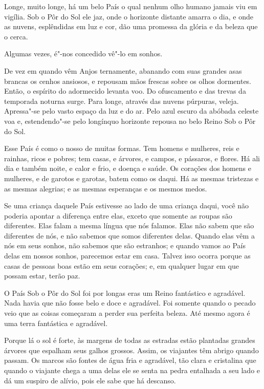  

Longe, muito longe, há um belo País o qual nenhum olho humano jamais viu
em vigília. Sob o Pôr do Sol ele jaz, onde o horizonte distante amarra o
dia, e onde as nuvens, esplêndidas em luz e cor, dão uma promessa da
glória e da beleza que o cerca.

Algumas vezes, é"-nos concedido vê"-lo em sonhos.

De vez em quando vêm Anjos ternamente, abanando com suas grandes asas
brancas os cenhos ansiosos, e repousam mãos frescas sobre os olhos
dormentes. Então, o espírito do adormecido levanta voo. Do ofuscamento e
das trevas da temporada noturna surge. Para longe, através das nuvens
púrpuras, veleja. Apressa"-se pelo vasto espaço da luz e do ar. Pelo azul
escuro da abóbada celeste voa e, estendendo"-se pelo longínquo horizonte
repousa no belo Reino Sob o Pôr do Sol.

Esse País é como o nosso de muitas formas. Tem homens e mulheres, reis e
rainhas, ricos e pobres; tem casas, e árvores, e campos, e pássaros, e
flores. Há ali dia e também noite, e calor e frio, e doença e saúde. Os
corações dos homens e mulheres, e de garotos e garotas, batem como os
daqui. Há as mesmas tristezas e as mesmas alegrias; e as mesmas
esperanças e os mesmos medos.

Se uma criança daquele País estivesse ao lado de uma criança daqui, você
não poderia apontar a diferença entre elas, exceto que somente as roupas
são diferentes. Elas falam a mesma língua que nós falamos. Elas não
sabem que são diferentes de nós, e não sabemos que somos diferentes
delas. Quando elas vêm a nós em seus sonhos, não sabemos que são
estranhos; e quando vamos ao País delas em nossos sonhos, parecemos
estar em casa. Talvez isso ocorra porque as casas de pessoas boas estão
em seus corações; e, em qualquer lugar em que possam estar, terão paz.

O País Sob o Pôr do Sol foi por longas eras um Reino fantástico e
agradável. Nada havia que não fosse belo e doce e agradável. Foi somente
quando o pecado veio que as coisas começaram a perder sua perfeita
beleza. Até mesmo agora é uma terra fantástica e agradável.

Porque lá o sol é forte, às margens de todas as estradas estão plantadas
grandes árvores que espalham seus galhos grossos. Assim, os viajantes
têm abrigo quando passam. Os marcos são fontes de água fria e agradável,
tão clara e cristalina que quando o viajante chega a uma delas ele se
senta na pedra entalhada a seu lado e dá um suspiro de alívio, pois ele
sabe que há descanso.

